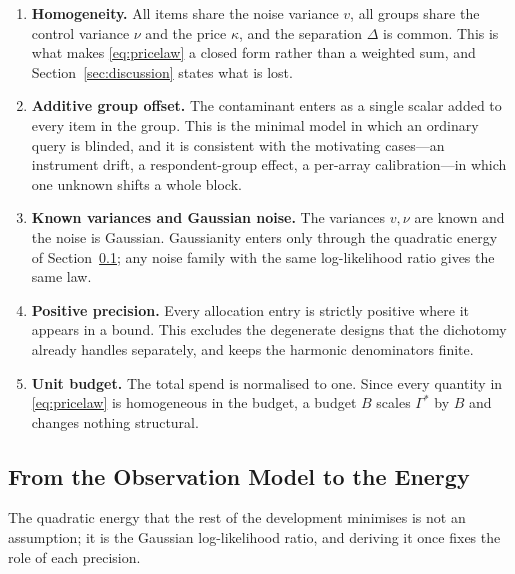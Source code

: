 \begin{enumerate}
\item[1)] \textbf{Homogeneity.} All items share the noise variance $v$, all groups share the
control variance $\nu$ and the price $\kappa$, and the separation $\Delta$ is common. This
is what makes \eqref{eq:pricelaw} a closed form rather than a weighted sum, and
Section~\ref{sec:discussion} states what is lost.

\item[2)] \textbf{Additive group offset.} The contaminant enters as a single scalar added to
every item in the group. This is the minimal model in which an ordinary query is blinded,
and it is consistent with the motivating cases---an instrument drift, a respondent-group
effect, a per-array calibration---in which one unknown shifts a whole block.

\item[3)] \textbf{Known variances and Gaussian noise.} The variances $v,\nu$ are known and
the noise is Gaussian. Gaussianity enters only through the quadratic energy of
Section~\ref{sec:energy}; any noise family with the same log-likelihood ratio gives the same
law.

\item[4)] \textbf{Positive precision.} Every allocation entry is strictly positive where it
appears in a bound. This excludes the degenerate designs that the dichotomy already handles
separately, and keeps the harmonic denominators finite.

\item[5)] \textbf{Unit budget.} The total spend is normalised to one. Since every quantity
in \eqref{eq:pricelaw} is homogeneous in the budget, a budget $B$ scales
$\Gamma^{*}$ by $B$ and changes nothing structural.
\end{enumerate}

\subsection{From the Observation Model to the Energy}
\label{sec:energy}

The quadratic energy that the rest of the development minimises is not an assumption; it is
the Gaussian log-likelihood ratio, and deriving it once fixes the role of each precision.

